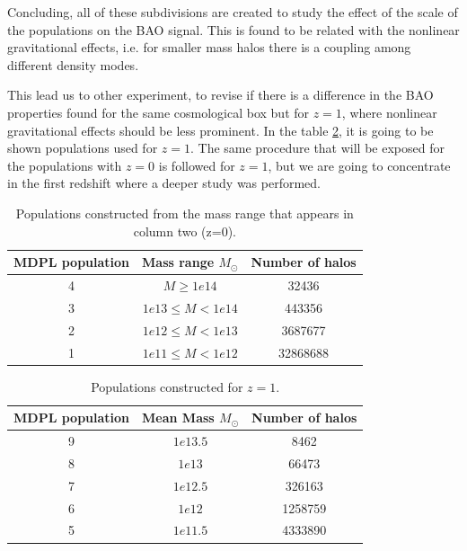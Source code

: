 Concluding, all of these subdivisions are created to study the effect of the scale of the populations 
on the BAO signal. This is found to be related with the nonlinear gravitational effects, i.e.
for smaller mass halos there is a coupling among different density modes. 

This lead us to other experiment, to revise if there is a difference in the BAO properties
found for the same cosmological box but for $z=1$, where nonlinear gravitational effects
should be less prominent. In the table \ref{z1}, it is going to be shown populations used 
for $z=1$. The same procedure that will be exposed for the populations with $z=0$ is followed
for $z=1$, but we are going to concentrate in the first redshift where a deeper study 
was performed. 

\begin{table}
\begin{center}
  \begin{tabular}{ | c | c | c | }
    \hline \hline
    MDPL population & Mass range $M_{\odot}$& Number of halos \\ \hline \hline
    4 & $ M \geqslant 1e14$ & 32436 \\ \hline
    3 & $ 1e13 \leq M < 1e14 $ & 443356\\ \hline
    2 & $ 1e12 \leq M < 1e13$ & 3687677\\ \hline
    1 & $ 1e11 \leq M < 1e12$ & 32868688 \\ \hline
  \end{tabular}  
   \caption{ Populations constructed from the mass range that appears in column two (z=0). }
\label{pophalos}
\end{center}
\end{table}


\begin{table}
\begin{center}
  \begin{tabular}{ | c | c | c | }
    \hline \hline
    MDPL population & Mean Mass $M_{\odot}$& Number of halos \\ \hline \hline    
    9 & $ 1e13.5$ & 8462\\ \hline
    8 & $ 1e13$ & 66473 \\ \hline
    7 & $ 1e12.5$ & 326163 \\ \hline
    6 & $ 1e12$ & 1258759 \\ \hline
    5 & $ 1e11.5$ & 4333890 \\ \hline
  \end{tabular}  
   \caption{ Populations constructed for $z=1$. }
\label{z1}
\end{center}
\end{table}



